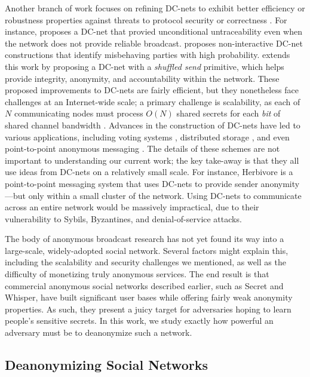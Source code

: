 Another branch of work focuses on refining DC-nets to exhibit better efficiency or robustness properties against threats to protocol security or correctness \cite{waidner1989dining,golle2004dining,corrigan2010dissent}.
For instance, \cite{waidner1989dining} proposes a DC-net that provied unconditional untraceability even when the network does not provide reliable broadcast. \cite{golle2004dining} proposes non-interactive DC-net constructions that identify misbehaving parties with high probability.
\cite{corrigan2010dissent} extends this work by proposing a DC-net with a \emph{shuffled send} primitive, which helps provide integrity, anonymity, and accountability within the network.
These proposed improvements to DC-nets are fairly efficient, but they nonetheless face challenges at an Internet-wide scale; a primary challenge is scalability, as each of $N$ communicating nodes must process $O(N)$ shared secrets for each \emph{bit} of shared channel bandwidth \cite{wolinsky2012dissent}.
Advances in the construction of DC-nets have led to various applications, including voting systems \cite{fujioka1993practical,van2010anonymous}, distributed storage \cite{freeHavenProject}, and even point-to-point anonymous messaging \cite{goel2003herbivore}.
The details of these schemes are not important to understanding our current work; the key take-away is that they all use ideas from DC-nets on a relatively small scale.
For instance, Herbivore \cite{goel2003herbivore} is a point-to-point messaging system that uses DC-nets to provide sender anonymity---but only within a small cluster of the network.
Using DC-nets to communicate across an entire network would be massively impractical, due to their vulnerability to Sybils, Byzantines, and denial-of-service attacks.

The body of anonymous broadcast research has not yet found its way into a large-scale, widely-adopted social network. 
Several factors might explain this, including the scalability and security challenges we mentioned, as well as the difficulty of monetizing truly anonymous services.
The end result is that commercial anonymous social networks described earlier, such as Secret and Whisper, have built significant user bases while offering fairly weak anonymity properties.
As such, they present a juicy target for adversaries hoping to learn people's sensitive secrets.
In this work, we study exactly how powerful an adversary must be to deanonymize such a network.

\subsection{Deanonymizing Social Networks}

